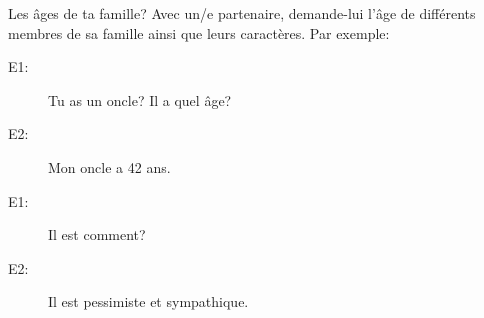 \begin{frame}{Les âges de ta famille?}
  Avec un/e partenaire, demande-lui l'âge de différents membres de sa famille ainsi que leurs caractères.
  Par exemple: \\
  \begin{description}
    \item[E1:] Tu as un oncle? Il a quel âge?
    \item[] 
    \item[E2:] Mon oncle a 42 ans.
    \item[] 
    \item[E1:] Il est comment?
    \item[] 
    \item[E2:] Il est pessimiste et sympathique.
    \item[] 
  \end{description}
\end{frame}